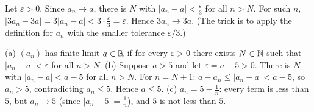 Let $\varepsilon>0$. Since $a_n\to a$, there is $N$ with $|a_n-a|<\frac\varepsilon3$ for all $n>N$. For such $n$,
$|3a_n-3a|=3|a_n-a|<3\cdot\frac\varepsilon3=\varepsilon$. Hence $3a_n\to3a$. (The trick is to apply the definition for $a_n$ with the smaller
tolerance $\varepsilon/3$.)

(a) $(a_n)$ has finite limit $a\in\mathbb{R}$ if for every $\varepsilon>0$ there exists $N\in\mathbb{N}$ such that $|a_n-a|<\varepsilon$ for all $n>N$.
(b) Suppose $a>5$ and let $\varepsilon=a-5>0$. There is $N$ with $|a_n-a|<a-5$ for all $n>N$. For $n=N+1$:
$a-a_n\le|a_n-a|<a-5$, so $a_n>5$, contradicting $a_n\le5$. Hence $a\le5$.
(c) $a_n=5-\frac1n$: every term is less than $5$, but $a_n\to5$ (since $|a_n-5|=\frac1n$), and $5$ is not less than $5$.
